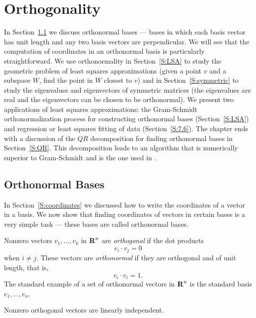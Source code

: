 \chapter{Orthogonality}
\label{Chap:LinTrans}

\normalsize


In Section~\ref{S:orthonormal} we discuss orthonormal bases --- bases in
which each basis vector has unit length and any two basis vectors are 
perpendicular.
We will see that the computation of coordinates in an orthonormal basis is
particularly straightforward.  We
use orthonormality in Section~\ref{S:LSA} to study the geometric problem of
least squares approximations (given a point $v$ and a subspace $W$, find
the point in $W$ closest to $v$) and in Section~\ref{S:symmetric} to study
the eigenvalues and eigenvectors of symmetric matrices (the eigenvalues are
real and the eigenvectors can be chosen to be orthonormal).  We present two
applications of least squares approximations:  the  Gram-Schmidt
orthonormalization process for constructing orthonormal bases
(Section~\ref{S:LSA}) and regression or least squares fitting of data
(Section~\ref{S:7.6}).   The chapter ends with a discussion of the $QR$
decomposition for finding orthonormal bases in Section~\ref{S:QR}.  This
decomposition leads to an algorithm that is numerically superior to
Gram-Schmidt and is the one used in \Matlabp.


\section{Orthonormal Bases}
\label{S:orthonormal}

In Section~\ref{S:coordinates} we discussed how to write the coordinates of
a vector in a basis.  We now show that finding coordinates of vectors in
certain bases is a very simple task --- these bases are called orthonormal
bases.

Nonzero vectors $v_1,\ldots,v_k$ in $\mbox{$\bf{R}$}^n$ are
{\em orthogonal\/} if the
dot products
\[
v_i\cdot v_j  =  0
\]
when $i\neq j$.  These vectors are
{\em orthonormal\/} if they are
orthogonal and of unit length, that is,
\[
v_i\cdot v_i=1.
\]
The standard example of a set of orthonormal vectors in $\mbox{$\bf{R}$}^n$ is the
standard basis $e_1,\ldots,e_n$.

\begin{lemma} \label{L:orthog}
Nonzero orthogonal vectors are
linearly independent.
\end{lemma}

